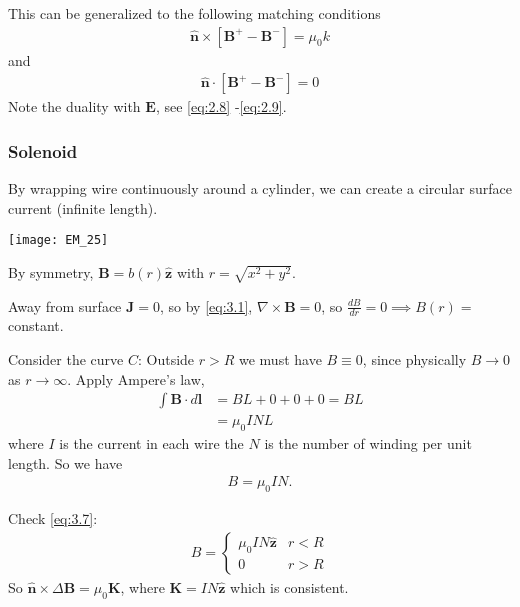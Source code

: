 \documentclass[a4paper]{article}
\begin{document}
This can be generalized to the following matching conditions
\begin{equation*}\tag{3.7} \label{eq:3.7}
\begin{aligned}
\hat{\mathbf{n}} \times [\mathbf{B}^+ - \mathbf{B}^- ] = \mu_0 k
\end{aligned}
\end{equation*}
and
\begin{equation*}\tag{3.8} \label{eq:3.8}
\begin{aligned}
\hat{\mathbf{n}} \cdot [\mathbf{B}^+ - \mathbf{B}^- ] = 0
\end{aligned}
\end{equation*}
Note the duality with $\mathbf{E}$, see \eqref{eq:2.8} -\eqref{eq:2.9}.

\subsubsection{Solenoid}

By wrapping wire continuously around a cylinder, we can create a circular surface current (infinite length).

\texttt{[image: EM\_25]}

By symmetry, $\mathbf{B} = b(r) \hat{\mathbf{z}}$ with $r=\sqrt{x^2+y^2}$.

Away from surface $\mathbf{J} = 0$, so by \eqref{eq:3.1}, $\nabla \times \mathbf{B} = 0$, so $\frac{dB}{dr} = 0 \implies B(r)=$constant.

Consider the curve $C$: Outside $r>R$ we must have $B \equiv 0$, since physically $B \to 0$ as $r \to \infty$. Apply Ampere's law,
\begin{equation*}
\begin{aligned}
\int \mathbf{B} \cdot d\mathbf{l} &= BL + 0 + 0 + 0 = BL\\
&= \mu_0 I NL
\end{aligned}
\end{equation*}
where $I$ is the current in each wire the $N$ is the number of winding per unit length. So we have
\begin{equation*}\tag{3.9} \label{eq:3.9}
\begin{aligned}
B = \mu_0 I N.
\end{aligned}
\end{equation*}

Check \eqref{eq:3.7}:
\begin{equation*}
\begin{aligned}
B= \left\{\begin{array}{ll}
\mu_0 IN \hat{\mathbf{z}} & r<R\\
0 & r>R
\end{array}\right.
\end{aligned}
\end{equation*}
So $\hat{\mathbf{n}} \times \Delta \mathbf{B} = \mu_0 \mathbf{K}$, where $\mathbf{K} = IN \hat{\mathbf{z}}$ which is consistent.
\end{document}
